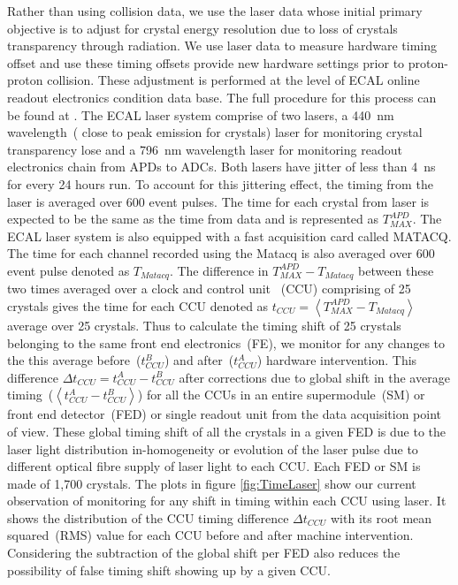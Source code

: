 Rather than using collision data, we use the laser data whose initial primary objective is to adjust for crystal energy resolution due to loss of crystals transparency through radiation. 
We use laser data to measure hardware timing offset and use these timing offsets provide new hardware settings prior to proton-proton collision. These adjustment is performed at the level of ECAL online readout electronics condition data base. The full procedure for this process can be found at \cite{LaserTiming}. The ECAL laser system comprise of two lasers, a 440~nm wavelength~( close to peak emission for \pb crystals) laser for monitoring crystal transparency lose and a 796~nm wavelength laser for monitoring readout electronics chain from APDs to ADCs. Both lasers have jitter of less than 4~ns for every 24 hours run. To account for this jittering effect, the timing from the laser is averaged over 600 event pulses. The time for each crystal from laser is expected to be the same as the time from data and is represented as $T^{APD}_{MAX} $. The ECAL laser system is also equipped with a fast acquisition card called MATACQ. The time for each channel recorded using the Matacq is also averaged over 600 event pulse denoted as $ T_{Matacq}$.
The difference in $ T^{APD}_{MAX} - T_{Matacq} $ between these two times averaged over a clock and control unit ~(CCU) comprising of 25 crystals gives the time for each CCU denoted as $ t_{CCU} = \left\langle T^{APD}_{MAX} - T_{Matacq} \right\rangle $ average over 25 crystals.
Thus to calculate the timing shift of 25 crystals belonging to the same front end electronics~(FE), we monitor for any changes to the this average before~($t^{B}_{CCU} $) and after~($t^{A}_{CCU} $) hardware intervention.  This difference $\Delta t_{CCU} = t^{A}_{CCU} - t^{B}_{CCU} $ after corrections due to global shift in the average timing~($\left\langle t^{A}_{CCU} - t^{B}_{CCU} \right\rangle $) for all the CCUs in an entire supermodule~(SM) or front end detector~(FED) or single readout unit from the data acquisition point of view. These global timing shift of all the crystals in a given FED is due to the laser light distribution in-homogeneity or evolution of the laser pulse due to different optical fibre supply of laser light to each CCU. Each FED or SM is made of 1,700 \pb crystals. 
The plots in figure \ref{fig:TimeLaser} show our current observation of  monitoring for any shift in timing within each CCU using laser. It shows the distribution of the CCU timing difference $ \Delta t_{CCU}$ with its root mean squared~(RMS) value for each CCU before and after machine intervention. Considering the subtraction of the global shift per FED also reduces the possibility of false timing shift showing up by a given CCU.

